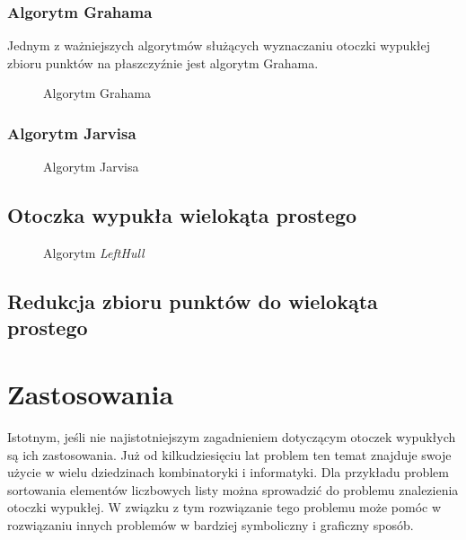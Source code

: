         \subsection{Algorytm Grahama}
        Jednym z ważniejszych algorytmów służących wyznaczaniu otoczki wypukłej zbioru punktów na płaszczyźnie jest algorytm Grahama.
        \newpage
        \begin{figure}[h!]
        		\begin{center}
    			
    			\caption{Algorytm Grahama}\label{fig:graham}
    			\end{center}
    			\mysource
    	\end{figure}
        \newpage
        \subsection{Algorytm Jarvisa}
        \begin{figure}[h!]
        		\begin{center}
    			
    			\caption{Algorytm Jarvisa}\label{fig:jarvis}
    			\end{center}
    			\mysource
    	\end{figure}
        
        
        \section{Otoczka wypukła wielokąta prostego}
             \begin{figure}[h!]
        		\begin{center}
    			
    			\caption{Algorytm \textit{LeftHull}}\label{fig:simple}
    			\end{center}
    			\mysource
    			\end{figure}
        \cite{convexhullsimplepolygon}
        \section{Redukcja zbioru punktów do wielokąta prostego}
    \chapter{Zastosowania} 
    Istotnym, jeśli nie najistotniejszym zagadnieniem dotyczącym otoczek wypukłych są ich zastosowania. Już od kilkudziesięciu lat problem ten temat znajduje swoje użycie w wielu dziedzinach kombinatoryki i informatyki. Dla przykładu problem sortowania elementów liczbowych listy można sprowadzić do problemu znalezienia otoczki wypukłej. W związku z tym rozwiązanie tego problemu może pomóc w rozwiązaniu innych problemów w bardziej symboliczny i graficzny sposób.
